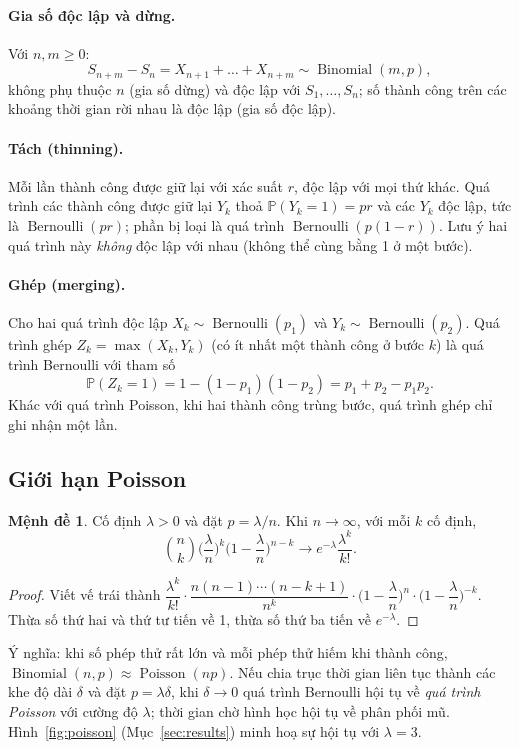 \documentclass[12pt,a4paper]{article}
\theoremstyle{definition}
\newtheorem{proposition}{Mệnh đề}[section]
\theoremstyle{remark}
\newcommand{\Prob}{\mathbb{P}}
\newcommand{\Bern}{\operatorname{Bernoulli}}
\newcommand{\Bin}{\operatorname{Binomial}}
\newcommand{\Pois}{\operatorname{Poisson}}
\begin{document}
\paragraph{Gia số độc lập và dừng.} Với $n,m \ge 0$:
\begin{equation}\label{eq:increments}
  S_{n+m} - S_n = X_{n+1} + \dots + X_{n+m} \sim \Bin(m,p),
\end{equation}
không phụ thuộc $n$ (gia số dừng) và độc lập với $S_1,\dots,S_n$; số thành công trên các khoảng thời gian rời
nhau là độc lập (gia số độc lập).

\paragraph{Tách (thinning).} Mỗi lần thành công được giữ lại với xác suất $r$, độc lập với mọi thứ khác. Quá
trình các thành công được giữ lại $Y_k$ thoả $\Prob(Y_k=1)=pr$ và các $Y_k$ độc lập, tức là
$\Bern(pr)$; phần bị loại là quá trình $\Bern(p(1-r))$. Lưu ý hai quá trình này \emph{không} độc lập với nhau
(không thể cùng bằng 1 ở một bước).

\paragraph{Ghép (merging).} Cho hai quá trình độc lập $X_k\sim\Bern(p_1)$ và $Y_k\sim\Bern(p_2)$. Quá trình
ghép $Z_k = \max(X_k,Y_k)$ (có ít nhất một thành công ở bước $k$) là quá trình Bernoulli với tham số
\begin{equation}\label{eq:merge}
  \Prob(Z_k = 1) = 1 - (1-p_1)(1-p_2) = p_1 + p_2 - p_1p_2 .
\end{equation}
Khác với quá trình Poisson, khi hai thành công trùng bước, quá trình ghép chỉ ghi nhận một lần.

\subsection{Giới hạn Poisson}
\begin{proposition}\label{prop:poisson}
Cố định $\lambda > 0$ và đặt $p = \lambda/n$. Khi $n\to\infty$, với mỗi $k$ cố định,
\begin{equation}\label{eq:poisson-limit}
  \binom nk\Big(\frac\lambda n\Big)^k\Big(1-\frac\lambda n\Big)^{n-k} \longrightarrow
  e^{-\lambda}\frac{\lambda^k}{k!}.
\end{equation}
\end{proposition}
\begin{proof}
Viết vế trái thành
$\dfrac{\lambda^k}{k!}\cdot\dfrac{n(n-1)\cdots(n-k+1)}{n^k}\cdot\Big(1-\dfrac\lambda n\Big)^{n}\cdot
\Big(1-\dfrac\lambda n\Big)^{-k}$. Thừa số thứ hai và thứ tư tiến về 1, thừa số thứ ba tiến về $e^{-\lambda}$.
\end{proof}
Ý nghĩa: khi số phép thử rất lớn và mỗi phép thử hiếm khi thành công, $\Bin(n,p)\approx\Pois(np)$. Nếu chia
trục thời gian liên tục thành các khe độ dài $\delta$ và đặt $p = \lambda\delta$, khi $\delta\to0$ quá trình
Bernoulli hội tụ về \emph{quá trình Poisson} với cường độ $\lambda$; thời gian chờ hình học hội tụ về phân phối
mũ. Hình~\ref{fig:poisson} (Mục~\ref{sec:results}) minh hoạ sự hội tụ với $\lambda=3$.
\end{document}
